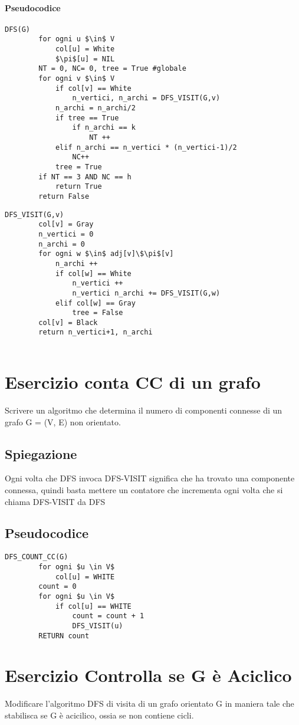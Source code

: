 \documentclass[12pt, a4paper, openany]{book}
\begin{document}
\paragraph*{Pseudocodice}
\begin{lstlisting}[style=small]
	DFS(G)
		for ogni u $\in$ V
			col[u] = White
			$\pi$[u] = NIL
		NT = 0, NC= 0, tree = True #globale
		for ogni v $\in$ V
			if col[v] == White
				n_vertici, n_archi = DFS_VISIT(G,v)
			n_archi = n_archi/2
			if tree == True
				if n_archi == k
					NT ++
			elif n_archi == n_vertici * (n_vertici-1)/2
				NC++
			tree = True
		if NT == 3 AND NC == h
			return True
		return False
\end{lstlisting}

\begin{lstlisting}[style=small]
	DFS_VISIT(G,v)
		col[v] = Gray
		n_vertici = 0
		n_archi = 0
		for ogni w $\in$ adj[v]\$\pi$[v]
			n_archi ++
			if col[w] == White
				n_vertici ++
				n_vertici n_archi += DFS_VISIT(G,w)
			elif col[w] == Gray
				tree = False
		col[v] = Black
		return n_vertici+1, n_archi
	
\end{lstlisting}

\section{Esercizio conta CC di un grafo}
Scrivere un algoritmo che determina il numero di componenti connesse di un grafo G =
(V, E) non orientato.

\subsection*{Spiegazione}
Ogni volta che DFS invoca DFS-VISIT significa che ha trovato una componente connessa, quindi basta mettere un contatore che incrementa ogni volta che si chiama DFS-VISIT da DFS
\subsection*{Pseudocodice}
\begin{lstlisting}[mathescape=true]
    DFS_COUNT_CC(G)
        for ogni $u \in V$
            col[u] = WHITE
        count = 0
        for ogni $u \in V$
            if col[u] == WHITE
                count = count + 1
                DFS_VISIT(u)
        RETURN count
\end{lstlisting}

\section{Esercizio Controlla se G è Aciclico}
Modificare l’algoritmo DFS di visita di un grafo orientato G in maniera tale che stabilisca
se G è acicilico, ossia se non contiene cicli.
\end{document}
